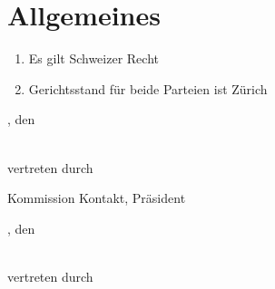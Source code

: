 \section{Allgemeines}
\begin{enumerate}
\item Es gilt Schweizer Recht
\item Gerichtsstand für beide Parteien ist Zürich
\end{enumerate}

\vfill
\noindent
\begin{minipage}[t]{0.45\textwidth}
\amivcity, den \hrulefill

\bigskip\noindent
\amivname\\
vertreten durch

\vspace{4em}
\hrulefill

\amivkontaktpresident

Kommission Kontakt, Präsident
\end{minipage}%
\hspace{0.1\textwidth}
\begin{minipage}[t]{0.45\textwidth}
\makebox[8em]{\hrulefill}, den \hrulefill

\bigskip\noindent
\companyname\\
vertreten durch

\vspace{4em}
\hrulefill

\companycontact\\

\end{minipage}

